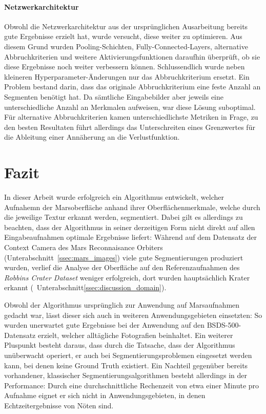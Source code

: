 \paragraph{Netzwerkarchitektur} Obwohl die Netzwerkarchitektur aus der ursprünglichen Ausarbeitung \cite{kanezaki_18} bereits gute Ergebnisse erzielt hat, wurde versucht, diese weiter zu optimieren. Aus diesem Grund wurden Pooling-Schichten, Fully-Connected-Layers, alternative Abbruchkriterien und weitere Aktivierungsfunktionen daraufhin überprüft, ob sie diese Ergebnisse noch weiter verbessern können. Schlussendlich wurde neben kleineren Hyperparameter-Änderungen nur das Abbruchkriterium ersetzt. Ein Problem bestand darin, dass das originale Abbruchkriterium eine feste Anzahl an Segmenten benötigt hat. Da sämtliche Eingabebilder aber jeweils eine unterschiedliche Anzahl an Merkmalen aufweisen, war diese Lösung suboptimal. Für alternative Abbruchkriterien kamen unterschiedlichste Metriken in Frage, zu den besten Resultaten führt allerdings das Unterschreiten eines Grenzwertes für die Ableitung einer Annäherung an die Verlustfunktion.

\section{Fazit}

In dieser Arbeit wurde erfolgreich ein Algorithmus entwickelt, welcher Aufnahemn der Marsoberfläche anhand ihrer Oberflächenmerkmale, welche durch die jeweilige Textur erkannt werden, segmentiert. Dabei gilt es allerdings zu beachten, dass der Algorithmus in seiner derzeitigen Form nicht direkt auf allen Eingabeaufnahmen optimale Ergebnisse liefert: Während auf dem Datensatz der Context Camera des Mars Reconnaisance Orbiters (\vgl Unterabschnitt~\ref{ssec:mars_images}) viele gute Segmentierungen produziert wurden, verlief die Analyse der Oberfläche auf den Referenzaufnahmen des \textit{Robbins Crater Dataset} \cite{robbins_12} weniger erfolgreich, dort wurden hauptsächlich Krater erkannt (\vgl~Unterabschnitt\ref{ssec:discussion_domain}).

Obwohl der Algorithmus ursprünglich zur Anwendung auf Marsaufnahmen gedacht war, lässt dieser sich auch in weiteren Anwendungsgebieten einsetzten: So wurden \bspw unerwartet gute Ergebnisse bei der Anwendung auf den BSDS-500-Datensatz \cite{bsd500} erzielt, welcher alltägliche Fotografien beinhaltet. Ein weiterer Pluspunkt besteht daraus, dass durch die Tatsache, dass der Algorithmus unüberwacht operiert, er auch bei Segmentierungsproblemen eingesetzt werden kann, bei denen keine Ground Truth existiert. Ein Nachteil gegenüber bereits vorhandener, klassischer Segmentierungsalgorithmen besteht allerdings in der Performance: Durch eine durchschnittliche Rechenzeit von etwa einer Minute pro Aufnahme eignet er sich nicht in Anwendungsgebieten, in denen Echtzeitergebnisse von Nöten sind.

